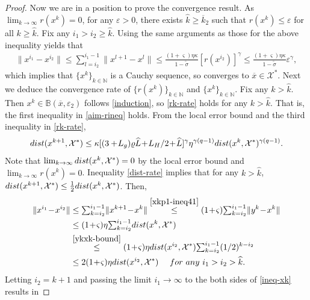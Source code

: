 \documentclass[10pt,a4paper]{amsart}
\begin{document}
\begin{proof}
  Now we are in a position to prove the convergence result. As $\lim_{k\to\infty}r(x^k)=0$, for any $\varepsilon>0$, there exists $\widehat{k}\ge \overline{k}_2$ such that $r(x^k)\le\varepsilon$ for all $k\ge\widehat{k}$. Fix any $i_1>i_2\ge\widehat{k}$. Using the same arguments as those for the above inequality yields that
  \begin{align*}%
   \|x^{i_1}-x^{i_2}\|\le\sum_{l=i_2}^{i_1-1}\|x^{l+1}-x^l\|
    \le\frac{(1+\varsigma)\eta\kappa}{1-\widetilde{\sigma}}[r(x^{i_2})]^{\gamma}
   \le\frac{(1+\varsigma)\eta\kappa}{1-\widetilde{\sigma}}\varepsilon^{\gamma},
  \end{align*}
  which implies that $\{x^k\}_{k\in\mathbb{N}}$ is a Cauchy sequence, so converges to $\overline{x}\in\mathcal{X}^*$. Next we deduce the convergence rate of $\{r(x^k)\}_{k\in\mathbb{N}}$ and $\{x^k\}_{k\in\mathbb{N}}$. Fix any $k>\widehat{k}$. Then $x^k\in\mathbb{B}(\overline{x},\varepsilon_2)$ follows \eqref{induction}, so \eqref{rk-rate} holds for any $k>\widehat{k}$. That is, the first inequality in \eqref{aim-rineq} holds. From the local error bound and the third inequality in \eqref{rk-rate},  
  \begin{equation}\label{dist-rate}
  {\rm dist}(x^{k+1},\mathcal{X}^*)\le\kappa[(3+\!L_g)\varrho \widehat{L}\!+\!{L_H}/{2}\!+\!\widehat{L}]^{\gamma}\eta^{\gamma(q-1)}{\rm dist}(x^k,\mathcal{X}^*)^{\gamma(q-1)}.
 \end{equation}
 Note that $\lim_{k\to\infty}{\rm dist}(x^k,\mathcal{X}^*)=0$ by the local error bound and $\lim_{k\to\infty}r(x^k)=0$. Inequality \eqref{dist-rate} implies that for any $k>\widehat{k}$, ${\rm dist}(x^{k+1},\mathcal{X}^*)\le\frac{1}{2}{\rm dist}(x^k,\mathcal{X}^*)$. Then, 
  \begin{align}\label{ineq-xk}
   \|x^{i_1}\!-\!x^{i_2}\|
   &\le{\textstyle\sum_{k=i_2}^{i_1-1}}\|x^{k+1}\!-\!x^k\|\stackrel{\eqref{xkp1-ineq41}}{\le}
    (1\!+\!\varsigma){\textstyle\sum_{k=i_2}^{i_1-1}}\|y^k\!-\!x^k\|\nonumber\\
   &\le(1\!+\!\varsigma)\eta{\textstyle\sum_{k=i_2}^{i_1-1}}{\rm dist}(x^k,\mathcal{X}^*)\nonumber\\
   &\stackrel{\eqref{ykxk-bound}}{\le}(1\!+\!\varsigma)\eta{\rm dist}(x^{i_2},\mathcal{X}^*){\textstyle\sum_{k=i_2}^{i_1-1}}(1/2)^{k-i_2}\nonumber\\
   &\le 2(1\!+\!\varsigma)\eta{\rm dist}(x^{i_2},\mathcal{X}^*)\quad\ {\rm for\ any}\ i_1>i_2>\widehat{k}.
  \end{align}
 Letting $i_2=k+1$ and passing the limit $i_1\to\infty$ to the both sides of \eqref{ineq-xk} results in

\end{proof}
\end{document}
